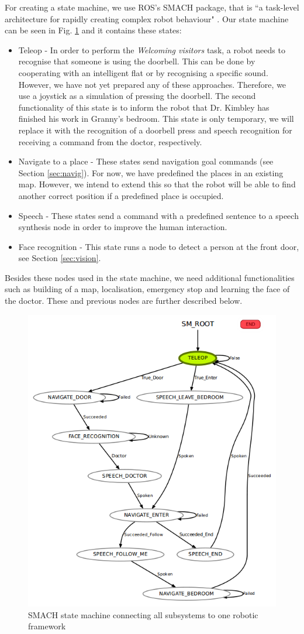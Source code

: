 \documentclass[conference]{IEEEtran}
\begin{document}
For creating a state machine, we use ROS's SMACH package, that is ``a task-level architecture for rapidly creating complex robot behaviour" \cite{smach}. Our state machine can be seen in Fig. \ref{fig:smach} and it contains these states:
\begin{itemize}
\item Teleop - In order to perform the \textit{Welcoming visitors} task, a robot needs to recognise that someone is using the doorbell. This can be done by cooperating with an intelligent flat or by recognising a specific sound. However, we have not yet prepared any of these approaches. Therefore, we use a joystick as a simulation of pressing the doorbell. 
The second functionality of this state is to inform the robot that Dr. Kimbley has finished his work in Granny's bedroom. This state is only temporary, we will replace it with the recognition of a doorbell press and speech recognition for receiving a command from the doctor, respectively.
\item Navigate to a place - These states send navigation goal commands (see Section \ref{sec:navig}). For now, we have predefined the places in an existing map. However, we intend to extend this so that the robot will be able to find another correct position if a predefined place is occupied.
\item Speech - These states send a command with a predefined sentence to a speech synthesis node in order to improve the human interaction.
\item Face recognition - This state runs a node to detect a person at the front door, see Section \ref{sec:vision}.
\end{itemize}

Besides these nodes used in the state machine, we need additional functionalities such as building of a map, localisation, emergency stop and learning the face of the doctor. These and previous nodes are further described below.

\begin{figure}[!htb]
\centering
\includegraphics[width=3.in]{state_machine.png}
\caption{SMACH state machine connecting all subsystems to one robotic framework}
\label{fig:smach}
\end{figure}
\end{document}
